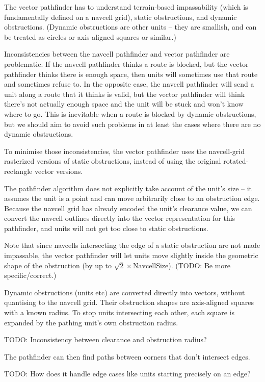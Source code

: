 \documentclass[a4paper,10pt]{article}
\begin{document}
The vector pathfinder has to understand terrain-based impassability
(which is fundamentally defined on a navcell grid),
static obstructions, and dynamic obstructions.
(Dynamic obstructions are other units -- they are smallish,
and can be treated as circles or axis-aligned squares or similar.)

Inconsistencies between the navcell pathfinder and vector pathfinder are problematic.
If the navcell pathfinder thinks a route is blocked,
but the vector pathfinder thinks there is enough space,
then units will sometimes use that route and sometimes refuse to.
In the opposite case, the navcell pathfinder will send a unit along a route
that it thinks is valid,
but the vector pathfinder will think there's not actually enough space
and the unit will be stuck and won't know where to go.
This is inevitable when a route is blocked by dynamic obstructions,
but we should aim to avoid such problems in at least the cases where there are
no dynamic obstructions.

To minimise those inconsistencies,
the vector pathfinder uses the navcell-grid rasterized versions of static obstructions,
instead of using the original rotated-rectangle vector versions.

The pathfinder algorithm does not explicitly take account of the unit's size --
it assumes the unit is a point and can move arbitrarily close to an obstruction edge.
Because the navcell grid has already encoded the unit's clearance value,
we can convert the navcell outlines directly into the vector representation
for this pathfinder, and units will not get too close to static obstructions.

Note that since navcells intersecting the edge of a static obstruction
are not made impassable,
the vector pathfinder will let units move slightly inside the
geometric shape of the obstruction
(by up to $\sqrt{2}\times\mathrm{NavcellSize}$).
(TODO: Be more specific/correct.)

Dynamic obstructions (units etc) are converted directly into vectors,
without quantising to the navcell grid.
Their obstruction shapes are axis-aligned squares with a known radius.
To stop units intersecting each other,
each square is expanded by the pathing unit's own obstruction radius.

TODO: Inconsistency between clearance and obstruction radius?

The pathfinder can then find paths between corners that don't intersect edges.

TODO: How does it handle edge cases like units starting precisely on an edge?
\end{document}
